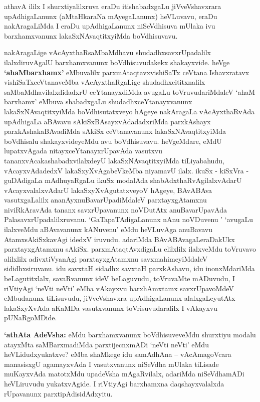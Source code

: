 \centerline{}

\begin{artha}
athavA ililx I shurxtiyalilxruva eraDu itishabadxgaLu jiVveVshavxrara
upAdhigaLanunx (aMtaHkaraNa mAyegaLanunx) heVLuvavu, eraDu
nakAragaLiMda I eraDu upAdhigaLanunx niSeVdhisuva mUlaka ivu
barxhamxvanunx lakaSxNAvaqtitxyiMda boVdhisuvavu.

nakAragaLige vAcAyxthaRsaMbaMdhavu shudadhxsavxrUpadalilx
ilalxdiruvAgalU barxhamxvanunx boVdhisuvudakekx shakayxvide. heVge
\textbf{`ahaMbarxhamx'} eMbuvalilx parxmAtaqtavxvishiSaTx ceVtana Ishavxratavx
vishiSaTxceVtanaveMba vAcAyxthaRgaLige shudadhxcititxnalilx
saMbaMdhavilalxdidadxrU ceYtanayxdiMda avugaLu toVruvudariMdaleV `ahaM
barxhamx' eMbuva shabadxgaLu shudadhxceYtanayxvanunx
lakaSxNAvaqtitxyiMda boVdhisutatxveyo hAgeye nakAragaLa vAcAyxthaRvAda
upAdhigaLa aBAvavu sAkiSxBAsayxvAdadadxriMda parxkAshayx
parxkAshakaBAvadiMda sAkiSx ceVtanavanunx lakaSxNAvaqtitxyiMda
boVdhisalu shakayxvideyeMdu avu boVdhisuvavu. heVgeMdare,
eMdU lupatxvAgada nitayxceYtanayxrUpavAda vasutxvu
tananxvAcakashabadxvilalxdeyU lakaSxNAvaqtitxyiMda tiLiyabahudu,
vAcayxvAdadedxV lakaSxyXvAgabeVkeMba niyamavU ilalx. ikuSx - kiSxVra -
guDAdigaLa mAdhuyaRgaLu ikuSx modalAda shabAdxthaRvAgilalxvAdarU vAcayxvalalxvAdarU lakaSxyXvAgutatxveyoV hAgeye, BAvABAva
vasutxgaLalilx ananAyxnuBavarUpadiMdaleV parxtayxgAtamxnu
niviRkAravAda tananx savxrUpavanunx noVDutAtx anuBavarUpavAda
PalasavxrUpadalilxruvanu. `GaTapaTAdigaLanunx nAnu noVDuvenu '
`avugaLu ilalxveMdu aBAvavanunx kANuvenu' eMdu heVLuvAga anuBavavu
AtamxsAkiSxkavAgi idedxV iruvudu. adariMda BAvABAvagaLeraDakUkx
parxtayxgAtamxnu sAkiSx. parxmAtaqtAvxdigaLu elilxlilx ilalxveMdu
toVruvavo alilxlilx adivxtiVyanAgi parxtayxgAtamxnu savxmahimeyiMdaleV
sididhxsiruvanu. idu savxtaH sidadhx savxtaH parxkAshavu, idu
inonxMdariMda beLagutitxlalx, savaRvanunx ideV beLaguvudu, toVruvaMte
mADuvudu, I riVtiyAgi `neVti neVti' eMba vAkayxvu barxhAmxtamx
savxrUpavoMdeV eMbudanunx tiLisuvudu, jiVveVshavxra upAdhigaLanunx
alalxgaLeyutAtx lakaSxyXvAda aKaMDa vasutxvanunx toVrisuvudaralilx I
vAkayxvu pUNaRgoMDide.

\textbf{`athAta AdeVsha:} eMdu barxhamxvanunx boVdhisuveveMdu shurxtiyu modalu
atayxMta saMBarxmadiMda parxtijecnxmADi `neVti neVti' eMdu heVLidudxyukatxve? eMba shaMkege
idu samAdhAna -- vAcAmagoVcara manasisxgU agamayxvAda I vasutxvanunx
niSeVdha mUlaka tiLisade muKayxvAda matotxMdu upadeVsha mAgaRvilalx,
adariMda niSeVdhamADi heVLiruvudu yukatxvAgide. I riVtiyAgi barxhamxna
daqshayxvalalxda rUpavanunx parxtipAdisidAdxyitu.
\end{artha}

